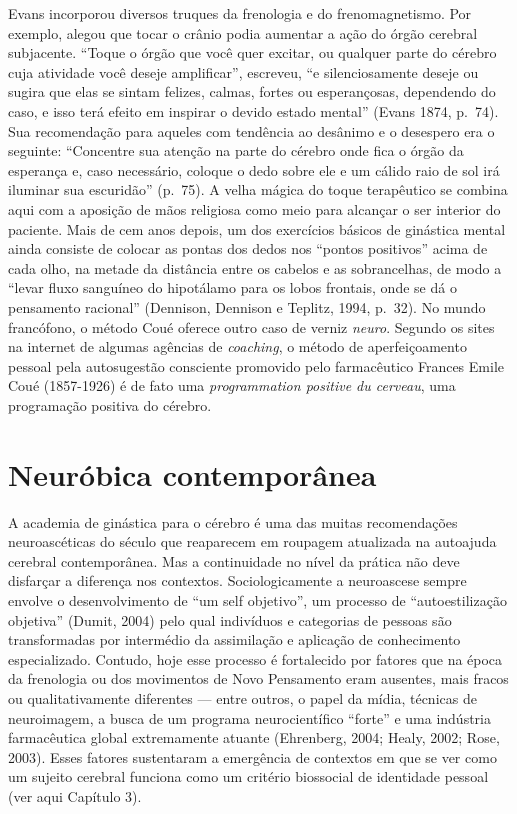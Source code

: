 Evans incorporou diversos truques da frenologia e do frenomagnetismo.
Por exemplo, alegou que tocar o crânio podia aumentar a ação do órgão
cerebral subjacente. ``Toque o órgão que você quer excitar, ou qualquer
parte do cérebro cuja atividade você deseje amplificar'', escreveu, ``e
silenciosamente deseje ou sugira que elas se sintam felizes, calmas,
fortes ou esperançosas, dependendo do caso, e isso terá efeito em
inspirar o devido estado mental'' (Evans 1874, p.~74). Sua recomendação
para aqueles com tendência ao desânimo e o desespero era o seguinte:
``Concentre sua atenção na parte do cérebro onde fica o órgão da
esperança e, caso necessário, coloque o dedo sobre ele e um cálido raio
de sol irá iluminar sua escuridão'' (p.~75). A velha mágica do toque
terapêutico se combina aqui com a aposição de mãos religiosa como meio
para alcançar o ser interior do paciente. Mais de cem anos depois, um
dos exercícios básicos de ginástica mental ainda consiste de colocar as
pontas dos dedos nos ``pontos positivos'' acima de cada olho, na metade
da distância entre os cabelos e as sobrancelhas, de modo a ``levar fluxo
sanguíneo do hipotálamo para os lobos frontais, onde se dá o pensamento
racional'' (Dennison, Dennison e Teplitz, 1994, p.~32). No mundo
francófono, o método Coué oferece outro caso de verniz \emph{neuro}.
Segundo os sites na internet de algumas agências de \emph{coaching}, o
método de aperfeiçoamento pessoal pela autosugestão consciente promovido
pelo farmacêutico Frances Emile Coué (1857-1926) é de fato uma
\emph{programmation positive du cerveau}, uma programação positiva do
cérebro.

\chapter{Neuróbica contemporânea}

A academia de ginástica para o cérebro é uma das muitas recomendações
neuroascéticas do século  que reaparecem em roupagem atualizada na
autoajuda cerebral contemporânea. Mas a continuidade no nível da prática
não deve disfarçar a diferença nos contextos. Sociologicamente a
neuroascese sempre envolve o desenvolvimento de ``um self objetivo'', um
processo de ``autoestilização objetiva'' (Dumit, 2004) pelo qual
indivíduos e categorias de pessoas são transformadas por intermédio da
assimilação e aplicação de conhecimento especializado. Contudo, hoje
esse processo é fortalecido por fatores que na época da frenologia ou
dos movimentos de Novo Pensamento eram ausentes, mais fracos ou
qualitativamente diferentes --- entre outros, o papel da mídia, técnicas
de neuroimagem, a busca de um programa neurocientífico ``forte'' e uma
indústria farmacêutica global extremamente atuante (Ehrenberg, 2004;
Healy, 2002; Rose, 2003). Esses fatores sustentaram a emergência de
contextos em que se ver como um sujeito cerebral funciona como um
critério biossocial de identidade pessoal (ver aqui Capítulo 3).

